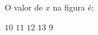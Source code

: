 O valor de $x$ na figura \'e:

\parbox{0.25\linewidth}{

$10$
$11$
$12$
$13$
$9$

}\parbox{0.74\linewidth}{
\begin{center}
\vspace{-6mm}
\vspace{-9mm}
\end{center}
}


